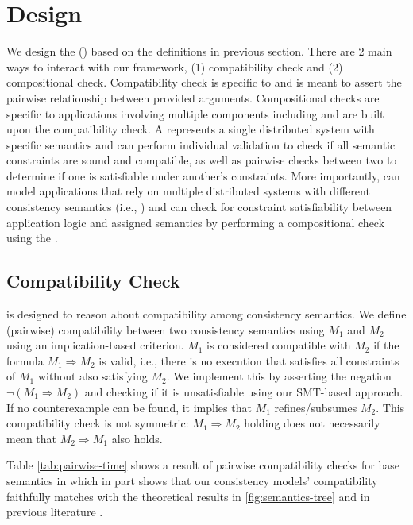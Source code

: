 \section{\sysname{} Design}
\label{sec:usage}

We design the \sysmodlong{} (\sysmod{}) based on the definitions in
previous section. There are 2 main ways to interact with our framework,
(1) compatibility check and (2) compositional check. Compatibility check is specific
to \sysmods and is meant to assert the pairwise relationship between provided
arguments. Compositional checks are specific to applications involving
multiple components including \sysmods{} and are
built upon the compatibility check.
A \sysmod{} represents a single distributed system with specific semantics
and \sysname{} can perform individual \sysmod{} validation to check if all
semantic constraints are sound and compatible, as
well as pairwise checks between two \sysmods{} to determine if one
is satisfiable under another's constraints.
More importantly, \sysname{} can model applications that rely on multiple
distributed systems with different
consistency semantics (i.e., \sysmods{}) and can check for constraint satisfiability
between application logic and assigned semantics by performing a
compositional check using the \sysgraph{}.

\subsection{Compatibility Check}

\sysname{} is designed to reason about
compatibility among consistency semantics.
We define (pairwise) compatibility between two consistency semantics using \sysmods{}
$M_1$ and $M_2$ using
an implication-based criterion. $M_1$ is considered compatible with
$M_2$ if the formula $M_1 \Rightarrow M_2$ is valid, i.e., there is no
execution that satisfies all constraints of $M_1$ without also
satisfying $M_2$.
We implement this by asserting the negation $\neg (M_1 \Rightarrow M_2)$ and
checking if it is unsatisfiable using our SMT-based approach. If no
counterexample can be found, it implies that $M_1$
refines/subsumes $M_2$. This compatibility check is not symmetric:
$M_1 \Rightarrow M_2$
holding does not necessarily mean that $M_2 \Rightarrow M_1$ also holds.

Table \ref{tab:pairwise-time} shows a result of pairwise
compatibility checks for
base semantics in \sysname{} which in part shows that our consistency
models' compatibility faithfully matches with the theoretical results
in \cref{fig:semantics-tree} and in previous literature \cite{terry1994session}.


